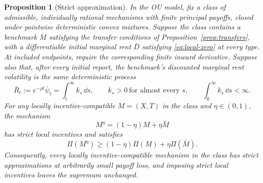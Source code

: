 \documentclass[12pt]{article}
\newtheorem{prop}{Proposition}
\begin{document}
\begin{prop}[Strict approximation]\label{prop:strict-approximation}
In the OU model, fix a class of admissible, individually rational
mechanisms with finite principal payoffs, closed under pointwise
deterministic convex mixtures. Suppose the class contains a benchmark
\(\bar M\) satisfying the transfer conditions of
Proposition~\ref{prop:transfers}, with a differentiable initial
marginal rent \(\bar D\) satisfying \eqref{eq:local-zero} at every
type. At included endpoints, require the corresponding finite inward
derivative. Suppose also that, after every initial report, the
benchmark's discounted marginal rent volatility is the same
deterministic process
\begin{equation}\label{eq:strict-benchmark}
  \bar R_t:=e^{-\rho t}\bar\psi_t
  =\int_t^\infty k_s\,\dd s,
  \qquad k_s>0\ \text{for almost every }s,
  \qquad \int_0^\infty k_s\,\dd s<\infty.
\end{equation}
For any locally incentive-compatible \(M=(X,T)\) in the class and
\(\eta\in(0,1)\), the mechanism
\[
  M^\eta=(1-\eta)M+\eta\bar M
\]
has strict local incentives and satisfies
\begin{equation}\label{eq:strict-payoff-bound}
  \Pi(M^\eta)
  \geq (1-\eta)\Pi(M)+\eta\Pi(\bar M).
\end{equation}
Consequently, every locally incentive-compatible mechanism in the
class has strict approximations at arbitrarily small payoff loss,
and imposing strict local incentives leaves the supremum unchanged.
\end{prop}
\end{document}
